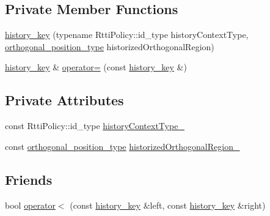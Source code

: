\subsection*{Private Member Functions}
\begin{DoxyCompactItemize}
\item 
\mbox{\hyperlink{classboost_1_1statechart_1_1detail_1_1history__key_a3a82daf417809c2f96ab4be96f982d6d}{history\+\_\+key}} (typename Rtti\+Policy\+::id\+\_\+type history\+Context\+Type, \mbox{\hyperlink{namespaceboost_1_1statechart_1_1detail_a3bedea0b807a16fa222733417183d2c9}{orthogonal\+\_\+position\+\_\+type}} historized\+Orthogonal\+Region)
\item 
\mbox{\hyperlink{classboost_1_1statechart_1_1detail_1_1history__key}{history\+\_\+key}} \& \mbox{\hyperlink{classboost_1_1statechart_1_1detail_1_1history__key_a07231e51068dc3259efdc07e343d0483}{operator=}} (const \mbox{\hyperlink{classboost_1_1statechart_1_1detail_1_1history__key}{history\+\_\+key}} \&)
\end{DoxyCompactItemize}
\subsection*{Private Attributes}
\begin{DoxyCompactItemize}
\item 
const Rtti\+Policy\+::id\+\_\+type \mbox{\hyperlink{classboost_1_1statechart_1_1detail_1_1history__key_afb38044f75e06873ac84495d7ef63b08}{history\+Context\+Type\+\_\+}}
\item 
const \mbox{\hyperlink{namespaceboost_1_1statechart_1_1detail_a3bedea0b807a16fa222733417183d2c9}{orthogonal\+\_\+position\+\_\+type}} \mbox{\hyperlink{classboost_1_1statechart_1_1detail_1_1history__key_a29dac24b6ad23d2445e8ac3cb71f8c65}{historized\+Orthogonal\+Region\+\_\+}}
\end{DoxyCompactItemize}
\subsection*{Friends}
\begin{DoxyCompactItemize}
\item 
bool \mbox{\hyperlink{classboost_1_1statechart_1_1detail_1_1history__key_ac8d9c052e17afa2f6a17530fd0fd25de}{operator$<$}} (const \mbox{\hyperlink{classboost_1_1statechart_1_1detail_1_1history__key}{history\+\_\+key}} \&left, const \mbox{\hyperlink{classboost_1_1statechart_1_1detail_1_1history__key}{history\+\_\+key}} \&right)
\end{DoxyCompactItemize}


